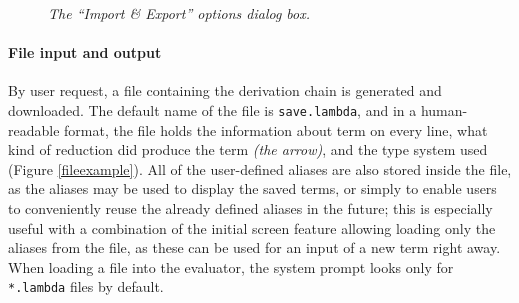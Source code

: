 \documentclass[table, a4paper, 10pt]{article}
\begin{document}
\begin{figure}[H]\centering
{}
\caption{\textit{The ``Import \& Export'' options dialog box.}}\label{iowindow}
\end{figure}

\paragraph{File input and output}
By user request, a file containing the derivation chain is generated and
downloaded. The default name of the file is \texttt{save.lambda}, and in a human-readable
format, the file holds the information about term on every line, what kind of reduction
did produce the term \textit{(the arrow)}, and the type system used (Figure \ref{fileexample}).
All of the user-defined aliases are also stored inside the file,
as the aliases may be used to display the saved terms, or simply to
enable users to conveniently reuse the already defined aliases in the future;
this is especially useful with a combination of the initial screen feature
allowing loading only the aliases from the file, as these can be used for an input
of a new term right away. When loading a file into the evaluator, the
system prompt looks only for \texttt{*.lambda} files by default.
\end{document}
